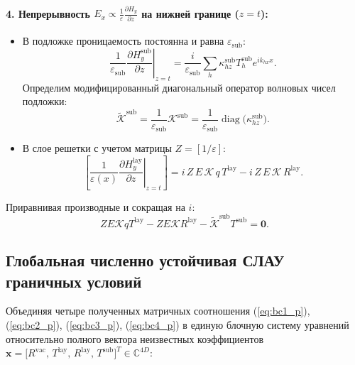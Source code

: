 \documentclass[a4paper,11pt]{article}
\begin{document}
\paragraph{4. Непрерывность $E_x \propto \frac{1}{\varepsilon} \frac{\partial H_y}{\partial z}$ на нижней границе ($z = t$):}
\begin{itemize}
    \item В подложке проницаемость постоянна и равна $\varepsilon_{\text{sub}}$:
    \begin{equation}
        \left.\frac{1}{\varepsilon_{\text{sub}}} \frac{\partial H_y^{\text{sub}}}{\partial z}\right|_{z=t} = \frac{i}{\varepsilon_{\text{sub}}} \sum_h \kappa_{hz}^{\text{sub}} T_h^{\text{sub}} e^{i k_{hx} x}.
    \end{equation}
    Определим модифицированный диагональный оператор волновых чисел подложки:
    \begin{equation}
        \tilde{\mathcal{K}}^{\text{sub}} = \frac{1}{\varepsilon_{\text{sub}}} \mathcal{K}^{\text{sub}} = \frac{1}{\varepsilon_{\text{sub}}} \operatorname{diag}\big(\kappa_{hz}^{\text{sub}}\big).
    \end{equation}
    \item В слое решетки с учетом матрицы $Z = [1/\varepsilon]$:
    \begin{equation}
        \left[ \frac{1}{\varepsilon(x)} \left.\frac{\partial H_y^{\text{lay}}}{\partial z}\right|_{z=t} \right] = i \, Z \, E \, \mathcal{K} \, q \, T^{\text{lay}} - i \, Z \, E \, \mathcal{K} \, R^{\text{lay}}.
    \end{equation}
\end{itemize}
Приравнивая производные и сокращая на $i$:
\begin{equation}
    Z E \mathcal{K} q T^{\text{lay}} - Z E \mathcal{K} R^{\text{lay}} - \tilde{\mathcal{K}}^{\text{sub}} T^{\text{sub}} = \mathbf{0}.
    \label{eq:bc4_p}
\end{equation}

\subsection{Глобальная численно устойчивая СЛАУ граничных условий}

Объединяя четыре полученных матричных соотношения (\ref{eq:bc1_p}), (\ref{eq:bc2_p}), (\ref{eq:bc3_p}), (\ref{eq:bc4_p}) в единую блочную систему уравнений относительно полного вектора неизвестных коэффициентов $\mathbf{x} = \big[ R^{\text{vac}}, \, T^{\text{lay}}, \, R^{\text{lay}}, \, T^{\text{sub}} \big]^T \in \mathbb{C}^{4D}$:
\end{document}
